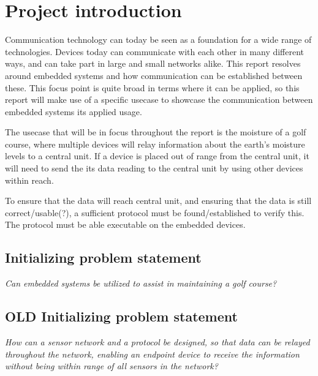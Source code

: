 \chapter{Project introduction}
Communication technology can today be seen as a foundation for a wide range of technologies. Devices today can communicate with each other in many different ways, and can take part in large and small networks alike.
%
This report resolves around embedded systems and how communication can be established between these. This focus point is quite broad in terms where it can be applied, so this report will make use of a specific usecase to showcase the communication between embedded systems its applied usage.

The usecase that will be in focus throughout the report is the moisture of a golf course, where multiple devices will relay information about the earth's moisture levels to a central unit. If a device is placed out of range from the central unit, it will need to send the its data reading to the central unit by using other devices within reach.

To ensure that the data will reach central unit, and ensuring that the data is still correct/usable(?), a sufficient protocol must be found/established to verify this. The protocol must be able executable on the embedded devices.

\section{Initializing problem statement}

\textit{Can embedded systems be utilized to assist in maintaining a golf course?}

\section{OLD Initializing problem statement}

\textit{How can a sensor network and a protocol be designed, so that data can be relayed throughout the network, enabling an endpoint device to receive the information without being within range of all sensors in the network?}
